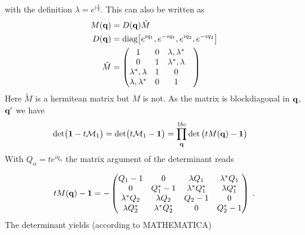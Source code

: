 with the definition $\lambda=e^{i\tfrac{\pi}{4}}$.
This can also be written as
%
\begin{subequations}\label{eq:}
\begin{align}
M(\mathbf q) &=  D(\mathbf q) \tilde M\\
D(\mathbf q) &=\text{diag} \big[ e^{i q_{1}},e^{-i q_{1}},e^{i q_{2}} ,e^{-i q_{2}}\big]\\
\tilde M &=
\begin{pmatrix}
	1&0&\lambda,\lambda^{*}\\
		0&1&\lambda^{*},\lambda\\
\lambda^{*},\lambda&	1&0&\\
\lambda,\lambda^{*}&	0&1&
\end{pmatrix}
\end{align}
\end{subequations}
%
Here $\tilde M$ is a hermitean matrix but $M$ is not.
As the matrix is blockdiagonal in $\mathbf q$, $\mathbf q'$ we have
%
\begin{align*}
\text{det} \big(\mathbf 1- t \mathcal{M}_{1} \big)=\text{det} \big(t \mathcal{M}_{1} - \mathbf 1 \big)
&=\prod_{\mathbf q}^{1bc} \det\big( t M(\mathbf q)  - \mathbf 1 \big)
\end{align*}
%
With $Q_{\alpha}=t e^{iq_{\alpha}}$ the matrix  argument of the determinant reads
%


%
\begin{align*}
  t M(\mathbf q) - \mathbf 1=
- \begin{pmatrix}
Q_{1}-1& 0& \lambda Q_{1}& \lambda^{*} Q_{1}\\
0& Q_{1}^{*}-1&\lambda^{*}Q_{1}^{*}& \lambda Q_{1}^{*}\\
\lambda^{*}Q_{2}&\lambda Q_{2}&Q_{2}-1& 0\\
 \lambda Q_{2}^{*}& \lambda^{*}Q_{2}^{*}& 0& Q_{2}^{*}-1
\end{pmatrix}\;.
\end{align*}
%
The determinant  yields (according to MATHEMATICA)

